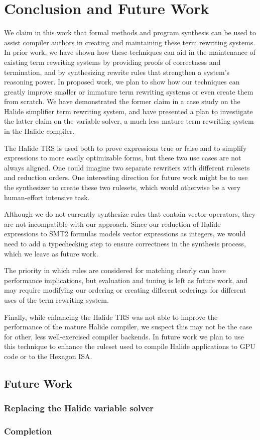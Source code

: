 \chapter{Conclusion and Future Work}
\label{chapter:conclusion}

We claim in this work that formal methods and program synthesis can be used to assist compiler authors in creating and maintaining these term rewriting systems. In prior work, we have shown how these techniques can aid in the maintenance of existing term rewriting systems by providing proofs of correctness and termination, and by synthesizing rewrite rules that strengthen a system's reasoning power. In proposed work, we plan to show how our techniques can greatly improve smaller or immature term rewriting systems or even create them from scratch. We have demonstrated the former claim in a case study on the Halide simplifier term rewriting system, and have presented a plan to investigate the latter claim on the variable solver, a much less mature term rewriting system in the Halide compiler.

The Halide TRS is used both to prove expressions true or false and to
simplify expressions to more easily optimizable forms, but these two use cases
are not always aligned. One could imagine two separate rewriters with
different rulesets and reduction orders. One interesting direction for future
work might be to use the synthesizer to create these two rulesets, which would
otherwise be a very human-effort intensive task.

Although we do not currently synthesize rules that contain vector operators,
they are not incompatible with our approach. Since our reduction of Halide
expressions to SMT2 formulas models vector expressions as integers, we would need
to add a typechecking step to ensure correctness in the synthesis process, which
we leave as future work.

The priority in which rules are considered for matching clearly can have
performance implications, but evaluation and tuning is left as future work, and
may require modifying our ordering or creating different orderings for different
uses of the term rewriting system.

Finally, while enhancing the Halide TRS was not able to improve the performance of the mature Halide compiler, we suspect this may not be the case for other, less well-exercised compiler backends. In future work we plan to use this technique to enhance the ruleset used to compile Halide applications to GPU code or to the Hexagon ISA.

\section{Future Work}

\subsection{Replacing the Halide variable solver}
\label{sec:varsolverreplacement}

\subsection{Completion}
\label{sec:completion}